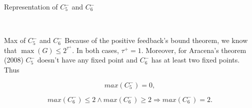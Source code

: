 \documentclass{beamer}
\begin{document}
\begin{frame}{Representation of $C_5^{-}$ and $C_6^{-}$}
\justifying
    \begin{figure}
    	\centering
    	\ \ \ \ 
    	\label{fig:comparison2}
    \end{figure}
\end{frame}

\begin{frame}{Max of $C_5^{-}$ and $C_6^{-}$}
\justifying
    Because of the positive feedback's bound theorem, we know that $\max(G)\leq 2^{\tau^+}$. In both cases, $\tau^+=1$. Moreover, for Aracena's theorem (2008) 
    $C_5^{-}$ doesn't have any fixed point and $C_6^{-}$ has at least two fixed points. Thus
    
    
    \[
        max(C_5^{-}) = 0,
    \]
    
    
    \[
        max(C_6^{-}) \leq 2 \land max(C_6^{-}) \geq 2 \Rightarrow max(C_6^{-}) = 2.
    \]
    
    
\end{frame}
\end{document}
